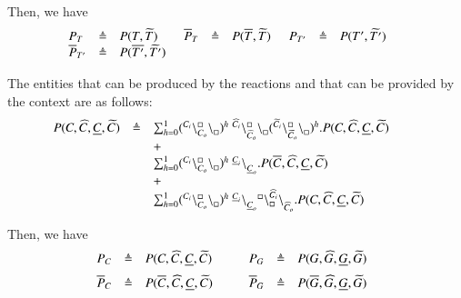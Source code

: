 Then, we have
\[
\begin{array}{lcl @{\hspace{0.5cm}}lcl @{\hspace{0.5cm}}lcl @{\hspace{0.5cm}}lcl}
P_T & \defeq & P(T,\widetilde{T})& \overline{P}_T & \defeq & P(\overline{T},\widetilde{T}) & P_{T'}& \defeq & P(T',\widetilde{T'}) & \\
\overline{P}_{T'}& \defeq & P(\overline{T'},\widetilde{T'})
\end{array}
\]

The entities that can be produced by the reactions and that can be  provided by the context are as follows:
\[
\begin{array}{lcl @{\hspace{1cm}}lcl}
P(C,\widehat{C},\underline{C},\widetilde{C}) & \defeq &  \sum_{h=0}^1 (\startchain{C_i}\chainedlink{C_o}{\noact}\chainend{\noact})^h \ \startchain{\widehat{C}_i}\chainedlink{\widehat{C}_o} {\noact}\chainend{\noact}( \startchain{\widetilde{C}_i}\chainedlink{\widetilde{C}_o}{\noact}\chainend{\noact})^h.   P(C,\widehat{C},\underline{C},\widetilde{C})\\
&&+\\
&& \sum_{h=0}^1 (\startchain{C_i}\chainedlink{C_o}{\noact}\chainend{\noact})^h\ \link{\underline{C}_i}{\underline{C}_o}.P(\overline{C},\widehat{C},\underline{C},\widetilde{C})\\
&&+\\
 && \sum_{h=0}^1 (\startchain{C_i}\chainedlink{C_o}{\noact}\chainend{\noact})^h\ \link{\underline{C}_i}{\underline{C}_o} \startchain{\noact}\chainedlink{\noact}{\widehat{C}_i}\chainend{\widehat{C}_o}.   P(C,\widehat{C},\underline{C},\widetilde{C}) \\
\end{array}
\]

Then, we have
\[
\begin{array}{lcl @{\hspace{1cm}}lcl@{\hspace{0.4cm}}lcl@{\hspace{0.4cm}}lcl}
P_C & \defeq &  P(C,\widehat{C},\underline{C},\widetilde{C})&  P_G& \defeq &   P(G,\widehat{G},\underline{G},\widetilde{G}) \\[6pt]
\overline{P}_C & \defeq &  P(\overline{C},\widehat{C},\underline{C},\widetilde{C}) & 
\overline{P}_G& \defeq &   P(\overline{G},\widehat{G},\underline{G},\widetilde{G})\\
\end{array}
\]

